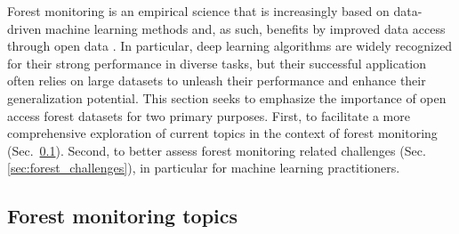 \documentclass{CUP-JNL-DTM}%
\theoremstyle{definition}
\numberwithin{equation}{section}
\begin{document}
%
Forest monitoring is an empirical science that is increasingly based on data-driven machine learning methods and, as such, benefits by improved data access through open data \cite{wulder_opening_2012, de_lima_making_2022}.
In particular, deep learning algorithms are widely recognized for their strong performance in diverse tasks, but their successful application often relies on large datasets to unleash their performance and enhance their generalization potential.
%
%
This section seeks to emphasize the importance of open access forest datasets for two primary purposes. First, to facilitate a more comprehensive exploration of current topics in the context of forest monitoring (Sec.~\ref{sec:forest_topics}). Second, to better assess forest monitoring related challenges (Sec. \ref{sec:forest_challenges}), in particular for machine learning practitioners. 

\subsection{Forest monitoring topics}
\label{sec:forest_topics}
\end{document}
